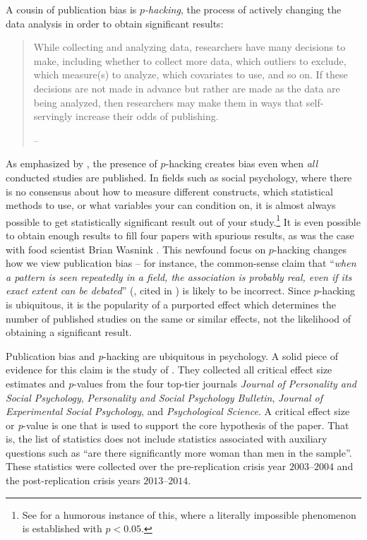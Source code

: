 A cousin of publication bias is \emph{$p$-hacking}, the process of actively changing the data analysis in order to obtain significant results:
\begin{quote}
While collecting and analyzing data, researchers have many decisions to make, including whether to collect more data, which outliers to exclude, which measure(s) to analyze, which covariates to use, and so on. If these decisions are not made in advance but rather are made as the data are being analyzed, then researchers may make them in ways that self-servingly increase their odds of publishing. 
\begin{flushright}
-- \textcite[p. 1]{simonsohn_p-curve:_2014}
\par\end{flushright}
\end{quote}
As emphasized by \textcite{simonsohn_p-curve:_2014}, the presence of $p$-hacking creates bias even when \emph{all} conducted studies are published. In fields such as social psychology, where there is no consensus about how to measure different constructs, which statistical methods to use, or what variables your can condition on, it is almost always possible to get statistically significant result out of your study.\footnote{See \textcite[p. 2, study 2]{simmons_false-positive_2011} for a humorous instance of this, where a literally impossible phenomenon is established with $p<0.05$.} It is even possible to obtain enough results to fill four papers with spurious results, as was the case with food scientist Brian Wasnink \parencite{van_der_zee_statistical_2017}. This newfound focus on $p$-hacking changes how we view publication bias -- for instance, the common-sense claim that ``\emph{when a pattern is seen repeatedly in a field, the association is probably real, even if its exact extent can be debated}\textquotedblright{} (\textcite{ioannidis_why_2008}, cited in \textcite{simonsohn_p-curve:_2014}) is likely to be incorrect. Since $p$-hacking is ubiquitous, it is the popularity of a purported effect which determines the number of published studies on the same or similar effects, not the likelihood of obtaining a significant result.

Publication bias and \emph{p}-hacking are ubiquitous in psychology. A solid piece of evidence for this claim is the study of \textcite{Motyl2017-dx}. They collected all critical effect size estimates and \emph{p}-values from the four top-tier journals \emph{Journal of Personality and Social Psychology}, \emph{Personality and Social Psychology Bulletin}, \emph{Journal of Experimental Social Psychology}, and \emph{Psychological Science}. A critical effect size or \emph{p}-value is one that is used to support the core hypothesis of the paper. That is, the list of statistics does not include statistics associated with auxiliary questions such as ``are there significantly more woman than men in the sample''. These statistics were collected over the pre-replication crisis year
$2003$--$2004$ and the post-replication crisis years $2013$--$2014$. 

